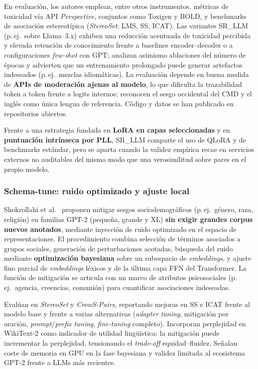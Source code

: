 \documentclass[12pt,a4paper]{report}
\begin{document}
En evaluación, los autores emplean, entre otros instrumentos, métricas de toxicidad vía API \textit{Perspective}, conjuntos como Toxigen y BOLD, y benchmarks de asociación estereotípica (\textit{StereoSet}: LMS, SS, ICAT). Las variantes SR\_LLM (p.\,ej.\ sobre Llama~3.x) exhiben una reducción acentuada de toxicidad percibida y elevada retención de conocimiento frente a baselines encoder--decoder o a configuraciones \textit{few-shot} con GPT; analizan asimismo ablaciones del número de épocas y advierten que un entrenamiento prolongado puede generar artefactos indeseados (p.\,ej.\ mezclas idiomáticas). La evaluación depende en buena medida de \textbf{APIs de moderación ajenas al modelo}, lo que dificulta la trazabilidad token a token frente a logits internos; reconocen el sesgo occidental del CMD y el inglés como única lengua de referencia. Código y datos se han publicado en repositorios abiertos.

Frente a una estrategia fundada en \textbf{LoRA en capas seleccionadas} y en \textbf{puntuación intrínseca por PLL}, SR\_LLM comparte el uso de QLoRA y de benchmarks estándar, pero se aparta cuando la validez empírica recae en servicios externos no auditables del mismo modo que una verosimilitud sobre pares en el propio modelo.

\subsubsection{Schema-tune: ruido optimizado y ajuste local}

Shokrollahi et al.\ \cite{shokrollahi_schema-tune_2025} proponen mitigar sesgos sociodemográficos (p.\,ej.\ género, raza, religión) en familias GPT-2 (pequeña, grande y XL) \textbf{sin exigir grandes corpus nuevos anotados}, mediante inyección de ruido optimizado en el espacio de representaciones. El procedimiento combina selección de términos asociados a grupos sociales, generación de perturbaciones acotadas, búsqueda del ruido mediante \textbf{optimización bayesiana} sobre un subespacio de \textit{embeddings}, y ajuste fino parcial de \textit{embeddings} léxicos y de la última capa FFN del Transformer. La función de mitigación se articula con un marco de atributos psicosociales (p.\,ej.\ agencia, creencias, comunión) para cuantificar asociaciones indeseadas.

Evalúan en \textit{StereoSet} y \textit{CrowS-Pairs}, reportando mejoras en SS e ICAT frente al modelo base y frente a varias alternativas (\textit{adapter tuning}, mitigación por oración, \textit{prompt}/\textit{prefix tuning}, \textit{fine-tuning} completo). Incorporan perplejidad en WikiText-2 como indicador de utilidad lingüística: la mitigación puede incrementar la perplejidad, tensionando el \textit{trade-off} equidad--fluidez. Señalan coste de memoria en GPU en la fase bayesiana y validez limitada al ecosistema GPT-2 frente a LLMs más recientes.
\end{document}
